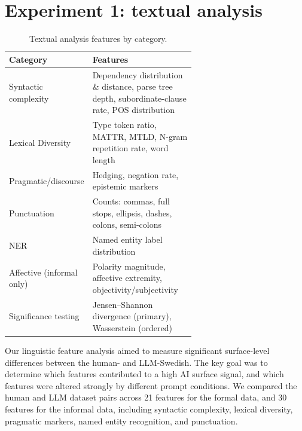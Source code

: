 \documentclass[thesis]{cluu}
\providecommand{\DIFaddbegin}{} %
\providecommand{\DIFaddend}{} %
\begin{document}


\section{Experiment 1: textual analysis}
\DIFaddbegin \label{sec:exp1-method}
\DIFaddend 

\begin{table}[H]
\centering
\setlength{\tabcolsep}{4pt}
\renewcommand{\arraystretch}{1.05}
\caption{Textual analysis features by category.}
\label{tab:textual-analysis-features}
\begin{tabular}{lp{0.62\linewidth}}
\toprule
\textbf{Category} & \textbf{Features} \\
\midrule
Syntactic complexity & Dependency distribution \& distance, parse tree depth, subordinate-clause rate, POS distribution \\
Lexical Diversity     & Type token ratio, MATTR, MTLD, N-gram repetition rate, word length \\
Pragmatic/discourse  & Hedging, negation rate, epistemic markers \\
Punctuation         & Counts: commas, full stops, ellipsis, dashes, colons, semi-colons \\
NER                  & Named entity label distribution \\
Affective (informal only)           & Polarity magnitude, affective extremity, objectivity/subjectivity \\
Significance testing   & Jensen--Shannon divergence (primary), Wasserstein (ordered) \\
\bottomrule
\end{tabular}
\end{table}

Our linguistic feature analysis aimed to measure significant surface-level differences between the human- and LLM-Swedish. The key goal was to determine which features contributed to a high AI surface signal, and which features were altered strongly by different prompt conditions. We compared the human and LLM dataset pairs across 21 features for the formal data, and 30 features for the informal data, including syntactic complexity, lexical diversity, pragmatic markers, named entity recognition, and punctuation.
\end{document}
